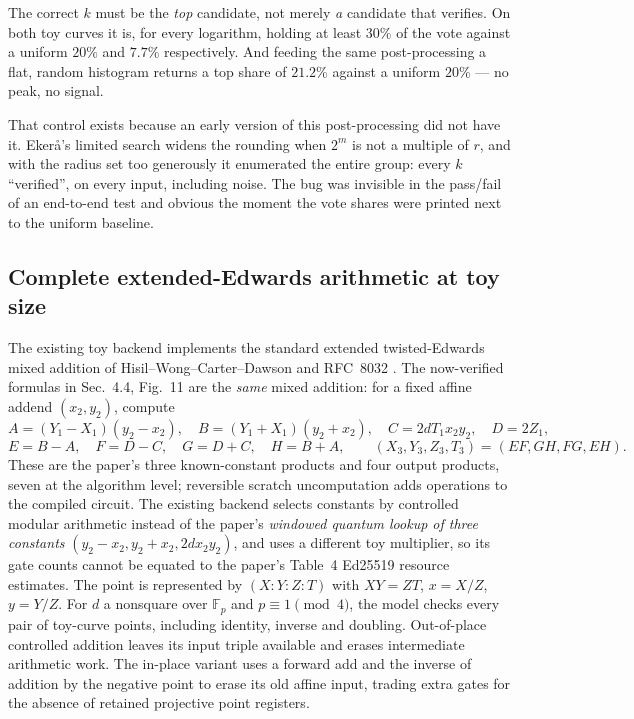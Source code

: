 \begin{warnbox}[title={The control that catches a broken circuit}]
The correct $k$ must be the \emph{top} candidate, not merely \emph{a} candidate that verifies. On
both toy curves it is, for every logarithm, holding at least $30\%$ of the vote against a uniform
$20\%$ and $7.7\%$ respectively. And feeding the same post-processing a flat, random histogram
returns a top share of $21.2\%$ against a uniform $20\%$ --- no peak, no signal.

That control exists because an early version of this post-processing did not have it. Eker\aa{}'s
limited search \cite{ec:ekera} widens the rounding when $2^m$ is not a multiple of $r$, and with the
radius set too generously it enumerated the entire group: every $k$ ``verified'', on every input,
including noise. The bug was invisible in the pass/fail of an end-to-end test and obvious the
moment the vote shares were printed next to the uniform baseline.
\end{warnbox}

\subsection{Complete extended-Edwards arithmetic at toy size}
\label{ec:sec:edwards-toy}

The existing toy  backend implements the standard
extended twisted-Edwards mixed addition of Hisil--Wong--Carter--Dawson and
RFC~8032 \cite{ec:rfc8032}. The now-verified formulas in \cite{ec:kim26}
Sec.~4.4, Fig.~11 are the \emph{same} mixed addition: for a fixed affine
addend $(x_2,y_2)$, compute
\[
A=(Y_1-X_1)(y_2-x_2),\quad B=(Y_1+X_1)(y_2+x_2),\quad
C=2dT_1x_2y_2,\quad D=2Z_1,
\]
\[
E=B-A,\quad F=D-C,\quad G=D+C,\quad H=B+A,\qquad
(X_3,Y_3,Z_3,T_3)=(EF,GH,FG,EH).
\]
These are the paper's three known-constant products and four output products,
seven at the algorithm level; reversible scratch uncomputation adds operations
to the compiled circuit. The existing backend selects constants by controlled
modular arithmetic instead of the paper's \emph{windowed quantum lookup of
three constants} $(y_2-x_2,y_2+x_2,2dx_2y_2)$, and uses a different toy
multiplier, so its gate counts cannot be equated to the paper's Table~4
Ed25519 resource estimates. The point is represented by $(X:Y:Z:T)$ with
$XY=ZT$, $x=X/Z$, $y=Y/Z$. For $d$ a nonsquare over $\mathbb F_p$
and $p\equiv1\pmod4$, the model checks every pair of toy-curve points,
including identity, inverse and doubling. Out-of-place controlled addition
leaves its input triple available and erases intermediate arithmetic work.
The in-place variant uses a forward add and the inverse of addition by
the negative point to erase its old affine input, trading extra gates for
the absence of retained projective point registers.

